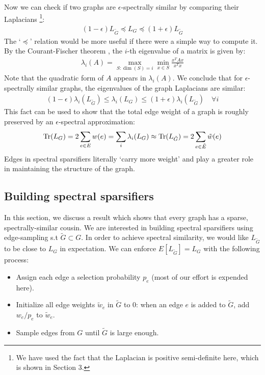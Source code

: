 \documentclass{article}
\begin{document}
Now we can check if two graphs are $\epsilon$-spectrally similar by
comparing their Laplacians \footnote{We have used the fact that the
Laplacian is positive semi-definite here, which is shown in Section 3.}:
\begin{align*}
    (1 - \epsilon)L_{\tilde{G}} \preceq L_G \preceq (1 +
    \epsilon)L_{\tilde{G}}
\end{align*}
The `$\preceq$' relation would be more useful if there were a simple way to
compute it. By the Courant-Fischer theorem \cite{CourantFischer}, the $i$-th
eigenvalue of a matrix is given by:
\begin{align*}
    \lambda_i(A) = \max_{S: \dim(S) = i} \min_{x \in S} \frac{x^TAx}{x^Tx}
\end{align*}
Note that the quadratic form of $A$ appears in $\lambda_i(A)$. We conclude
that for $\epsilon$-spectrally similar graphs, the eigenvalues of the graph
Laplacians are similar:
\begin{align*}
    (1 - \epsilon)\lambda_i(L_{\tilde{G}}) \leq \lambda_i(L_G) \leq (1 +
    \epsilon)\lambda_i(L_{\tilde{G}}) \quad \forall{i}
\end{align*}
This fact can be used to show that the total edge weight of a graph is
roughly preserved by an $\epsilon$-spectral approximation:
\begin{align*}
    \text{Tr}(L_G) = 2\sum_{e \in E} w(e) = \sum_i \lambda_i(L_G) \approx
    \text{Tr}(L_{\tilde{G}}) = 2\sum_{e \in \tilde{E}} \tilde{w}(e)
\end{align*}
Edges in spectral sparsifiers literally `carry more weight' and play a
greater role in maintaining the structure of the graph.

\subsection{Building spectral sparsifiers}

In this section, we discuss a result which shows that every graph has a
sparse, spectrally-similar cousin. We are interested in building spectral
sparsifiers using edge-sampling s.t $\tilde{G} \subset G$. In order to
achieve spectral similarity, we would like $L_{\tilde{G}}$ to be close to
$L_G$ in expectation. We can enforce $E[L_{\tilde{G}}] = L_G$ with the
following process:
\begin{itemize}
    \item Assign each edge a selection probability $p_e$ (most of our effort
        is expended here).
    \item Initialize all edge weights $\tilde{w}_e$ in $\tilde{G}$ to 0:
        when an edge $e$ is added to $\tilde{G}$, add $w_e/p_e$ to
        $\tilde{w}_e$.
    \item Sample edges from $G$ until $\tilde{G}$ is large enough.
\end{itemize}
\end{document}
